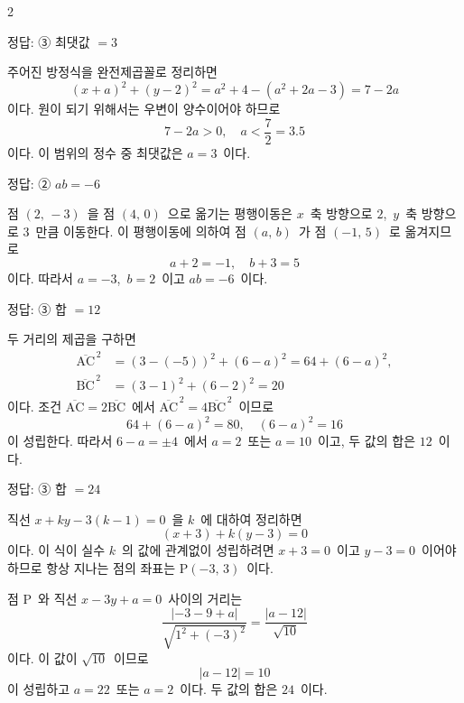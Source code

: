 \documentclass[10pt,fleqn]{article}
\begin{document}
\begin{multicols*}{2}
\begin{dmanswerbox}
정답: ③ 최댓값 $=3$
\end{dmanswerbox}

주어진 방정식을 완전제곱꼴로 정리하면
\[ (x+a)^2+(y-2)^2 = a^2+4-(a^2+2a-3) = 7-2a \]
이다. 원이 되기 위해서는 우변이 양수이어야 하므로
\[ 7-2a>0,\quad a<\dfrac{7}{2}=3.5 \]
이다. 이 범위의 정수 중 최댓값은 $a=3$\ 이다.

\begin{dmanswerbox}
정답: ② $ab=-6$
\end{dmanswerbox}

점 $(2,\,-3)$\ 을 점 $(4,\,0)$\ 으로 옮기는 평행이동은 $x$\ 축 방향으로 $2$,\ $y$\ 축 방향으로 $3$\ 만큼 이동한다. 이 평행이동에 의하여 점 $(a,\,b)$\ 가 점 $(-1,\,5)$\ 로 옮겨지므로
\[ a+2=-1,\quad b+3=5 \]
이다. 따라서 $a=-3$,\ $b=2$\ 이고 $ab=-6$\ 이다.

\begin{dmanswerbox}
정답: ③ 합 $=12$
\end{dmanswerbox}

두 거리의 제곱을 구하면
\begin{align*}
\overline{\mathrm{AC}}^{\,2} &= (3-(-5))^2+(6-a)^2 = 64+(6-a)^2, \\
\overline{\mathrm{BC}}^{\,2} &= (3-1)^2+(6-2)^2 = 20
\end{align*}
이다. 조건 $\overline{\mathrm{AC}}=2\overline{\mathrm{BC}}$\ 에서 $\overline{\mathrm{AC}}^{\,2}=4\overline{\mathrm{BC}}^{\,2}$\ 이므로
\[ 64+(6-a)^2 = 80,\quad (6-a)^2=16 \]
이 성립한다. 따라서 $6-a=\pm 4$\ 에서 $a=2$\ 또는 $a=10$\ 이고, 두 값의 합은 $12$\ 이다.

\begin{dmanswerbox}
정답: ③ 합 $=24$
\end{dmanswerbox}

직선 $x+ky-3(k-1)=0$\ 을 $k$\ 에 대하여 정리하면
\[ (x+3)+k(y-3) = 0 \]
이다. 이 식이 실수 $k$\ 의 값에 관계없이 성립하려면 $x+3=0$\ 이고 $y-3=0$\ 이어야 하므로 항상 지나는 점의 좌표는 $\mathrm{P}(-3,\,3)$\ 이다.

점 $\mathrm{P}$\ 와 직선 $x-3y+a=0$\ 사이의 거리는
\[ \dfrac{|-3-9+a|}{\sqrt{1^2+(-3)^2}} = \dfrac{|a-12|}{\sqrt{10}} \]
이다. 이 값이 $\sqrt{10}$\ 이므로
\[ |a-12| = 10 \]
이 성립하고 $a=22$\ 또는 $a=2$\ 이다. 두 값의 합은 $24$\ 이다.


\end{multicols*}
\end{document}
